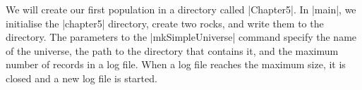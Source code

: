 We will create our first population in a directory called |Chapter5|.
In |main|, we initialise the |chapter5| directory, create two rocks,
and write them to the directory.
The parameters to the |mkSimpleUniverse| command specify the name of the universe,
the path to the directory that contains it,
and the maximum number of records in a log file.
When a log file reaches the maximum size, it is closed and a new log file is started.

